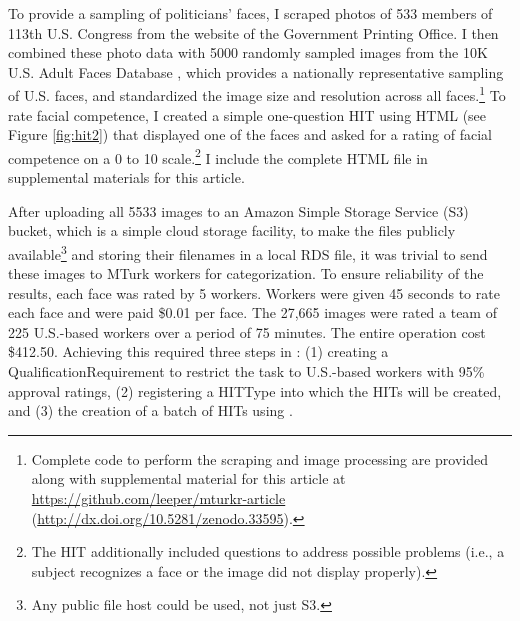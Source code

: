 To provide a sampling of politicians' faces, I scraped photos of 533 members of 113th U.S. Congress from the website of the Government Printing Office. I then combined these photo data with 5000 randomly sampled images from the 10K U.S. Adult Faces Database \citep{BainbridgeIsolaOliva2013}, which provides a nationally representative sampling of U.S. faces, and standardized the image size and resolution across all faces.\footnote{Complete code to perform the scraping and image processing are provided along with supplemental material for this article at \url{https://github.com/leeper/mturkr-article} (\url{http://dx.doi.org/10.5281/zenodo.33595}).} To rate facial competence, I created a simple one-question HIT using HTML (see Figure \ref{fig:hit2}) that displayed one of the faces and asked for a rating of facial competence on a 0 to 10 scale.\footnote{The HIT additionally included questions to address possible problems (i.e., a subject recognizes a face or the image did not display properly).} I include the complete HTML file in supplemental materials for this article.

After uploading all 5533 images to an Amazon Simple Storage Service (S3) bucket, which is a simple cloud storage facility, to make the files publicly available\footnote{Any public file host could be used, not just S3.} and storing their filenames in a local RDS file, it was trivial to send these images to MTurk workers for categorization. To ensure reliability of the results, each face was rated by 5 workers. Workers were given 45 seconds to rate each face and were paid \$0.01 per face. The 27,665 images were rated a team of 225 U.S.-based workers over a period of 75 minutes. The entire operation cost \$412.50. Achieving this required three steps in : (1) creating a QualificationRequirement to restrict the task to U.S.-based workers with 95\% approval ratings, (2) registering a HITType into which the HITs will be created, and (3) the creation of a batch of HITs using .

